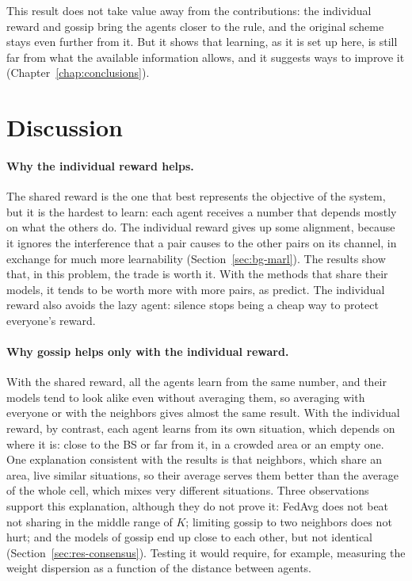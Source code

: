 This result does not take value away from the contributions: the individual reward and gossip bring the
agents closer to the rule, and the original scheme stays even further from it. But it shows that learning, as
it is set up here, is still far from what the available information allows, and it suggests ways to improve
it (Chapter~\ref{chap:conclusions}).

\section{Discussion}
\label{sec:res-discussion}

\paragraph{Why the individual reward helps.} The shared reward is the one that best represents the objective
of the system, but it is the hardest to learn: each agent receives a number that depends mostly on what the
others do. The individual reward gives up some alignment, because it ignores the interference that a pair
causes to the other pairs on its channel, in exchange for much more learnability (Section~\ref{sec:bg-marl}).
The results show that, in this problem, the trade is worth it. With the methods that share their models, it
tends to be worth more with more pairs, as \citet{agogino+08rewards} predict. The individual reward also avoids
the lazy agent: silence stops being a
cheap way to protect everyone's reward.

\paragraph{Why gossip helps only with the individual reward.} With the shared reward, all the agents learn
from the same number, and their models tend to look alike even without averaging them, so averaging with
everyone or with the neighbors gives almost the same result. With the individual reward, by contrast, each
agent learns from its own situation, which depends on where it is: close to the \ac{BS} or far from it, in a
crowded area or an empty one. One explanation consistent with the results is that neighbors, which share an
area, live similar situations, so their average serves them better than the average of the whole cell, which
mixes very different situations. Three observations support this explanation, although they do not prove
it: \ac{FedAvg} does not beat not sharing in the middle range of $K$; limiting gossip to two neighbors does
not hurt; and the models of gossip end up close to each other, but not identical
(Section~\ref{sec:res-consensus}). Testing it would require, for example, measuring the weight dispersion
as a function of the distance between agents.

